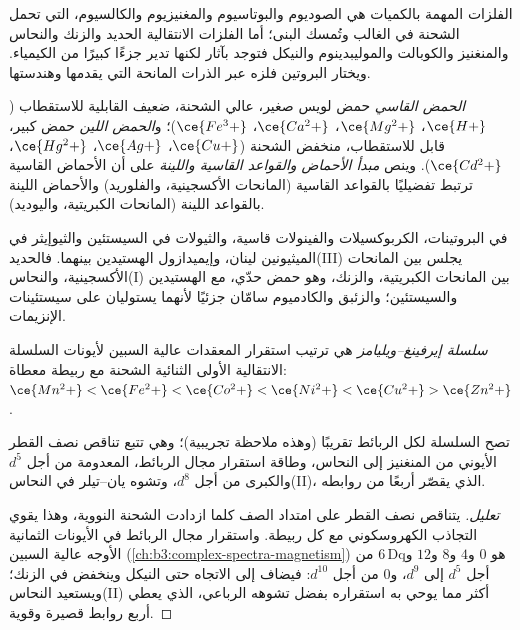 الفلزات المهمة بالكميات هي الصوديوم والبوتاسيوم والمغنيزيوم 
والكالسيوم، التي تحمل الشحنة في الغالب وتُمسك البنى؛ أما الفلزات الانتقالية
الحديد والزنك والنحاس والمنغنيز والكوبالت والموليبدينوم والنيكل فتوجد بآثار
لكنها تدير جزءًا كبيرًا من الكيمياء. ويختار البروتين فلزه عبر الذرات المانحة
التي يقدمها وهندستها.

\begin{definition}\label{def:b3:bioinorganic:hsab}
\emph{الحمض القاسي} حمض لويس صغير، عالي الشحنة، ضعيف
القابلية للاستقطاب ($\ce{H+}$، $\ce{Mg^2+}$، $\ce{Ca^2+}$، $\ce{Fe^3+}$)؛ و\emph{الحمض
اللين} حمض كبير، قابل للاستقطاب، منخفض الشحنة ($\ce{Cu+}$، $\ce{Ag+}$،
$\ce{Hg^2+}$، $\ce{Cd^2+}$). وينص \emph{مبدأ الأحماض والقواعد القاسية واللينة}
على أن الأحماض القاسية ترتبط تفضيليًا بالقواعد القاسية
(المانحات الأكسجينية، والفلوريد) والأحماض اللينة بالقواعد اللينة (المانحات الكبريتية، واليوديد).
\end{definition}

في البروتينات، الكربوكسيلات والفينولات قاسية، والثيولات في السيستئين 
والثيوإيثر في الميثيونين لينان، وإيميدازول الهستيدين بينهما. فالحديد(III)
يجلس بين المانحات الأكسجينية، والنحاس(I) بين المانحات الكبريتية، والزنك، وهو حمض
حدّي، مع الهستيدين والسيستئين؛ والزئبق والكادميوم سامّان جزئيًا
لأنهما يستوليان على سيستئينات الإنزيمات.

\begin{definition}\label{def:b3:bioinorganic:irving-williams}
\emph{سلسلة إيرفينغ--ويليامز} هي ترتيب
استقرار المعقدات عالية السبين لأيونات السلسلة الانتقالية الأولى الثنائية الشحنة
مع ربيطة معطاة:
$\ce{Mn^2+} < \ce{Fe^2+} < \ce{Co^2+} < \ce{Ni^2+} < \ce{Cu^2+} > \ce{Zn^2+}$.
\end{definition}

\begin{proposition}\label{prop:b3:bioinorganic:irving-williams}
تصح السلسلة لكل الربائط تقريبًا (وهذه ملاحظة تجريبية)؛ وهي
تتبع تناقص نصف القطر الأيوني من المنغنيز إلى النحاس، وطاقة استقرار
مجال الربائط، المعدومة من أجل $d^5$ والكبرى من أجل $d^8$، وتشوه يان--تيلر
في النحاس(II)، الذي يقصّر أربعًا من روابطه.
\end{proposition}

\begin{proof}[تعليل]
يتناقص نصف القطر على امتداد الصف كلما ازدادت الشحنة النووية، وهذا يقوي
التجاذب الكهروسكوني مع كل ربيطة. واستقرار مجال الربائط في
الأيونات الثمانية الأوجه عالية السبين (\cref{ch:b3:complex-spectra-magnetism}) هو $0$ و$4$ 
و$8$ و$12$ و$6\,\mathrm{Dq}$ من أجل $d^5$ إلى $d^9$، و$0$ من أجل $d^{10}$: فيضاف إلى الاتجاه حتى النيكل 
وينخفض في الزنك؛ ويستعيد النحاس(II) أكثر مما يوحي به استقراره بفضل
تشوهه الرباعي، الذي يعطي أربع روابط قصيرة وقوية.
\end{proof}

